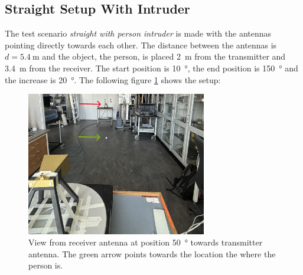 \subsection{Straight Setup With Intruder}
The test scenario \textit{straight with person intruder} is made with the antennas pointing directly towards each other. The distance between the antennas is $d=\SI{5.4}{\meter}$ and the object, the person, is placed \SI{2}{\meter} from the transmitter and \SI{3.4}{\meter} from the receiver. The start position is \SI{10}{\degree}, the end position is \SI{150}{\degree} and the increase is \SI{20}{\degree}. The following figure \ref{fig:a2_5} shows the setup:
\begin{figure}[H]
    \centering
    \includegraphics[width=0.7\textwidth]{figures/test_intruder_person.JPG}
    \caption{View from receiver antenna at position \SI{50}{\degree} towards transmitter antenna. The green arrow points towards the location the where the person is.} \label{fig:a2_5}
\end{figure}

